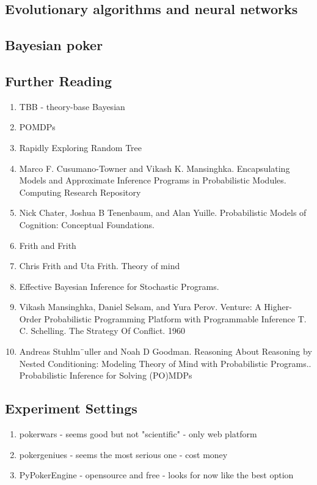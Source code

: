 \documentclass{article}
\begin{document}
\subsection{Evolutionary algorithms and neural networks}

\subsection{Bayesian poker}
\subsection{Further Reading}
\begin{enumerate}
\item TBB - theory-base Bayesian
\item  POMDPs
\item Rapidly Exploring Random Tree
\item  Marco F. Cusumano-Towner and Vikash K. Mansinghka. Encapsulating Models and Approximate Inference Programs in Probabilistic Modules. Computing Research Repository
\item Nick Chater, Joshua B Tenenbaum, and Alan Yuille. Probabilistic Models of Cognition: Conceptual Foundations.
\item Frith and Frith
\item   Chris Frith and Uta Frith. Theory of mind
\item  Effective Bayesian Inference for Stochastic Programs. 
\item  Vikash Mansinghka, Daniel Selsam, and Yura Perov. Venture: A Higher-Order Probabilistic Programming Platform with Programmable Inference T. C. Schelling. The Strategy Of Conflict. 1960
\item  Andreas Stuhlm¨uller and Noah D Goodman. Reasoning About Reasoning by Nested Conditioning: Modeling Theory of Mind with Probabilistic Programs.. Probabilistic Inference for Solving (PO)MDPs
\end{enumerate}

\subsection{Experiment Settings}
\begin{enumerate}
\item pokerwars - seems good but not "scientific" - only web platform
\item pokergeniues - seems the most serious one - cost money
\item PyPokerEngine - opensource and free - looks for now like the best option
\end{enumerate}


\end{document}
